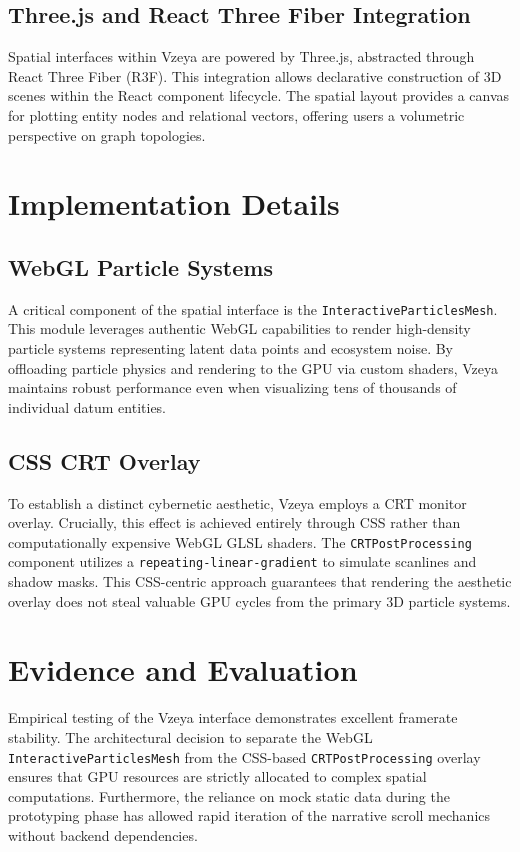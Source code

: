 \subsection{Three.js and React Three Fiber Integration}
Spatial interfaces within Vzeya are powered by Three.js, abstracted through React Three Fiber (R3F). This integration allows declarative construction of 3D scenes within the React component lifecycle. The spatial layout provides a canvas for plotting entity nodes and relational vectors, offering users a volumetric perspective on graph topologies.

\section{Implementation Details}

\subsection{WebGL Particle Systems}
A critical component of the spatial interface is the \texttt{InteractiveParticlesMesh}. This module leverages authentic WebGL capabilities to render high-density particle systems representing latent data points and ecosystem noise. By offloading particle physics and rendering to the GPU via custom shaders, Vzeya maintains robust performance even when visualizing tens of thousands of individual datum entities.

\subsection{CSS CRT Overlay}
To establish a distinct cybernetic aesthetic, Vzeya employs a CRT monitor overlay. Crucially, this effect is achieved entirely through CSS rather than computationally expensive WebGL GLSL shaders. The \texttt{CRTPostProcessing} component utilizes a \texttt{repeating-linear-gradient} to simulate scanlines and shadow masks. This CSS-centric approach guarantees that rendering the aesthetic overlay does not steal valuable GPU cycles from the primary 3D particle systems.

\section{Evidence and Evaluation}
Empirical testing of the Vzeya interface demonstrates excellent framerate stability. The architectural decision to separate the WebGL \texttt{InteractiveParticlesMesh} from the CSS-based \texttt{CRTPostProcessing} overlay ensures that GPU resources are strictly allocated to complex spatial computations. Furthermore, the reliance on mock static data during the prototyping phase has allowed rapid iteration of the narrative scroll mechanics without backend dependencies.

